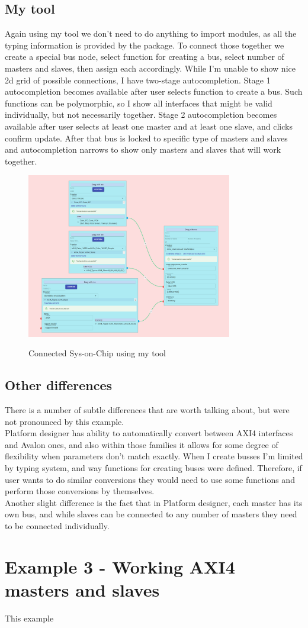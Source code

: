 \documentclass[12pt]{report}
\begin{document}
\subsection{My tool}
Again using my tool we don't need to do anything to import modules, as all the typing information is provided by the package. To connect those together we create a special bus node, select function for creating a bus, select number of masters and slaves, then assign each accordingly. While I'm unable to show nice 2d grid of possible connections, I have two-stage autocompletion. Stage 1 autocompletion becomes available after user selects function to create a bus. Such functions can be polymorphic, so I show all interfaces that might be valid individually, but not necessarily together. Stage 2 autocompletion becomes available after user selects at least one master and at least one slave, and clicks confirm update. After that bus is locked to specific type of masters and slaves and autocompletion narrows to show only masters and slaves that will work together.
\begin{figure}
    \caption{Connected Sys-on-Chip using my tool}
    \includegraphics[width=0.8\textwidth]{images/Example2MySolution.png} \\
    \centering
\end{figure}

\subsection{Other differences}
There is a number of subtle differences that are worth talking about, but were not pronounced by this example.
\\
Platform designer has ability to automatically convert between AXI4 interfaces and Avalon ones, and also within those families it allows for some degree of flexibility when parameters don't match exactly.
When I create busses I'm limited by typing system, and way functions for creating buses were defined. Therefore, if user wants to do similar conversions they would need to use some functions and perform those conversions by themselves.
\\
Another slight difference is the fact that in Platform designer, each master has its own bus, and while slaves can be connected to any number of masters they need to be connected individually. 
\section{Example 3 - Working AXI4 masters and slaves}
This example 
\end{document}
